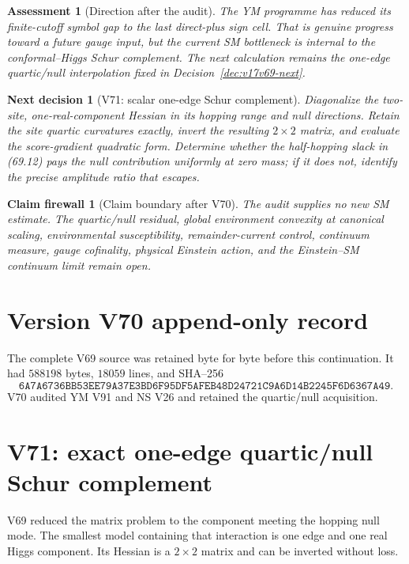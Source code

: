 \documentclass[11pt]{article}
\newtheorem{firewall}[theorem]{Claim firewall}
\newtheorem{decision}[theorem]{Next decision}
\newtheorem{assessment}[theorem]{Assessment}
\theoremstyle{remark}
\begin{document}
\begin{assessment}[Direction after the audit]
\label{ass:v17v70-direction}
The YM programme has reduced its finite-cutoff symbol gap to the last
direct-plus sign cell.  That is genuine progress toward a future gauge
input, but the current SM bottleneck is internal to the conformal--Higgs
Schur complement.  The next calculation remains the one-edge
quartic/null interpolation fixed in Decision~\ref{dec:v17v69-next}.
\end{assessment}

\begin{decision}[V71: scalar one-edge Schur complement]
\label{dec:v17v70-next}
Diagonalize the two-site, one-real-component Hessian in its hopping
range and null directions.  Retain the site quartic curvatures exactly,
invert the resulting \(2\times2\) matrix, and evaluate the score-gradient
quadratic form.  Determine whether the half-hopping slack in (69.12)
pays the null contribution uniformly at zero mass; if it does not,
identify the precise amplitude ratio that escapes.
\end{decision}

\begin{firewall}[Claim boundary after V70]
\label{fire:v17v70}
The audit supplies no new SM estimate.  The quartic/null residual,
global environment convexity at canonical scaling, environmental
susceptibility, remainder-current control, continuum measure, gauge
cofinality, physical Einstein action, and the Einstein--SM continuum
limit remain open.
\end{firewall}

\section*{Version V70 append-only record}
The complete V69 source was retained byte for byte before this
continuation.  It had \(588198\) bytes, \(18059\) lines, and SHA--256
\[
 \texttt{6A7A6736BB53EE79A37E3BD6F95DF5AFEB48D24721C9A6D14B2245F6D6367A49}.
\]
V70 audited YM V91 and NS V26 and retained the quartic/null acquisition.


\section{V71: exact one-edge quartic/null Schur complement}
\label{sec:v17v71}

V69 reduced the matrix problem to the component meeting the hopping
null mode.  The smallest model containing that interaction is one
edge and one real Higgs component.  Its Hessian is a \(2\times2\)
matrix and can be inverted without loss.
\end{document}
